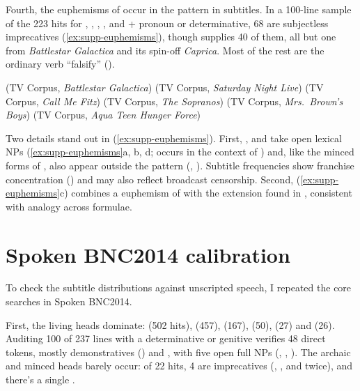 \documentclass[12pt]{article}
\begin{document}
Fourth, the euphemisms of  occur in the pattern in subtitles. In a 100-line sample of the 223 hits for , , , ,  and  + pronoun or determinative, 68 are subjectless imprecatives (\ref{ex:supp-euphemisms}), though  supplies 40 of them, all but one from \emph{Battlestar Galactica} and its spin-off \emph{Caprica}. Most of the rest are the ordinary verb  \enquote{falsify} ().

\ea\label{ex:supp-euphemisms}
\ea {} \hfill (TV Corpus, \emph{Battlestar Galactica})
\ex {} \hfill (TV Corpus, \emph{Saturday Night Live})
\ex {} \hfill (TV Corpus, \emph{Call Me Fitz})
\ex {} \hfill (TV Corpus, \emph{The Sopranos})
\ex {} \hfill (TV Corpus, \emph{Mrs.\ Brown's Boys})
\ex {} \hfill (TV Corpus, \emph{Aqua Teen Hunger Force})
\z
\z

Two details stand out in (\ref{ex:supp-euphemisms}). First, ,  and  take open lexical NPs (\ref{ex:supp-euphemisms}a, b, d;  occurs in the context of ) and, like the minced forms of , also appear outside the pattern (, ). Subtitle frequencies show franchise concentration () and may also reflect broadcast censorship. Second,  (\ref{ex:supp-euphemisms}c) combines a euphemism of  with the extension found in , consistent with analogy across formulae.

\clearpage
\section{Spoken BNC2014 calibration}\label{supp:speech}

To check the subtitle distributions against unscripted speech, I repeated the core searches in Spoken BNC2014.

First, the living heads dominate:  (502 hits),  (457),  (167),  (50),  (27) and  (26). Auditing 100 of 237 lines with a determinative or genitive verifies 48 direct tokens, mostly demonstratives () and , with five open full NPs (, , ). The archaic and minced heads barely occur: of 22 hits, 4 are imprecatives (, , and  twice), and there's a single .
\end{document}
